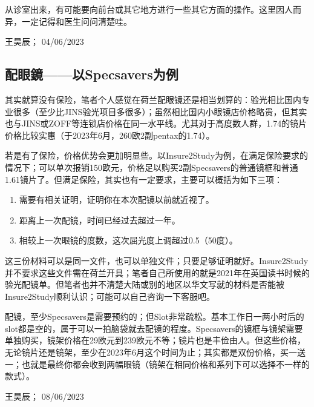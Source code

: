 从诊室出来，有可能要向前台或其它地方进行一些其它方面的操作。这里因人而异，一定记得和医生问问清楚哇。
\begin{flushright}
王昊辰； 04/06/2023
\end{flushright}

\subsection{配眼鏡——以Specsavers为例}
其实就算没有保险，笔者个人感觉在荷兰配眼镜还是相当划算的：验光相比国内专业很多（至少比JINS验光项目多很多）；虽然相比国内小眼镜店价格略贵，但其实也与JINS或ZOFF等连锁店价格在同一水平线。尤其对于高度数人群，1.74的镜片价格比较实惠（于2023年6月，260欧2副pentax的1.74）。

若是有了保险，价格优势会更加明显些。以Insure2Study为例，在满足保险要求的情况下；可以单次报销150欧元，价格足以购买2副Specsavers的普通镜框和普通1.61镜片了。但满足保险，其实也有一定要求，主要可以概括为如下三项：

\begin{enumerate}
\item 需要有相关证明，证明你在本次配镜以前就近视了。
\item 距离上一次配镜，时间已经过去超过一年。
\item 相较上一次眼镜的度数，这次屈光度上调超过0.5（50度）。
\end{enumerate}

这三份材料可以是同一文件，也可以单独文件；只要足够证明就好。Insure2Study并不要求这些文件需在荷兰开具；笔者自己所使用的就是2021年在英国读书时候的验光配镜单。但笔者也并不清楚大陆或别的地区以华文写就的材料是否能被Insure2Study顺利认识；可能可以自己咨询一下客服吧。

配镜，至少Specsavers是需要预约的；但Slot非常疏松。基本工作日一两小时后的slot都是空的，属于可以一拍脑袋就去配镜的程度。Specsavers的镜框与镜架需要单独购买，镜架价格在29欧元到239欧元不等；镜片也是丰俭由人。但这些价格，无论镜片还是镜架，至少在2023年6月这个时间为止；其实都是双份价格，买一送一；也就是最终你都会收到两幅眼镜（镜架在相同价格和系列下可以选择不一样的款式）。
\begin{flushright}
王昊辰； 08/06/2023
\end{flushright}

\vspace{\betsubsec} %




